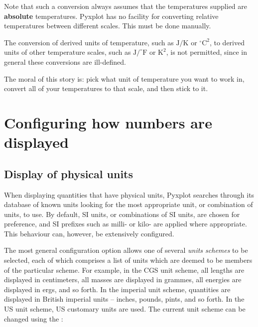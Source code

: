 Note that such a conversion always assumes that the temperatures supplied are
{\bf absolute} temperatures. Pyxplot has no facility for converting relative
temperatures between different scales. This must be done manually.

The conversion of derived units of temperature, such as $\mathrm{J}/\mathrm{K}$
or $^\circ\mathrm{C}^2$, to derived units of other temperature scales, such as
$\mathrm{J}/^\circ\mathrm{F}$ or $\mathrm{K}^2$, is not permitted, since in
general these conversions are ill-defined.

The moral of this story is: pick what unit of temperature you want to work in,
convert all of your temperatures to that scale, and then stick to it.


\section{Configuring how numbers are displayed}
\label{sec:unitdisp}

\subsection{Display of physical units}

When displaying quantities that have physical units, Pyxplot searches through
its database of known units looking for the most appropriate unit, or
combination of units, to use.  By default, SI units, or combinations of SI
units, are chosen for preference, and SI prefixes such as milli- or kilo- are
applied where appropriate. This behaviour can, however, be extensively
configured.

The most general configuration option allows one of several {\it units
schemes} to be selected, each of which comprises a
list of units which are deemed to be members of the particular scheme. For
example, in the CGS unit scheme, all lengths
are displayed in centimeters, all masses are displayed in grammes, all energies
are displayed in ergs, and so forth.  In the imperial unit
scheme, quantities are displayed in
British imperial units -- inches, pounds, pints, and so forth. In the US unit
scheme, US customary units are used. The current unit scheme can be changed
using the :

